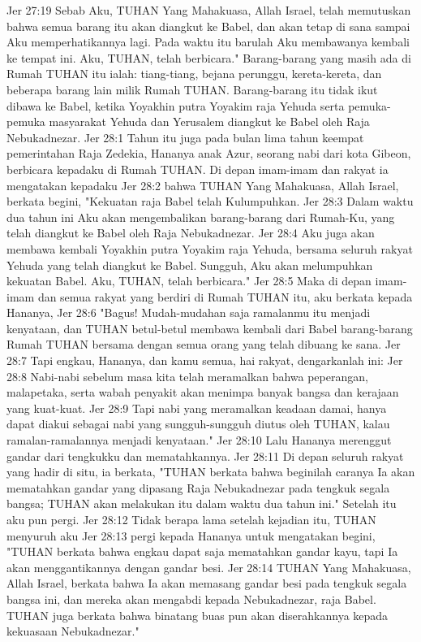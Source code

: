 Jer 27:19  Sebab Aku, TUHAN Yang Mahakuasa, Allah Israel, telah memutuskan bahwa semua barang itu akan diangkut ke Babel, dan akan tetap di sana sampai Aku memperhatikannya lagi. Pada waktu itu barulah Aku membawanya kembali ke tempat ini. Aku, TUHAN, telah berbicara." Barang-barang yang masih ada di Rumah TUHAN itu ialah: tiang-tiang, bejana perunggu, kereta-kereta, dan beberapa barang lain milik Rumah TUHAN. Barang-barang itu tidak ikut dibawa ke Babel, ketika Yoyakhin putra Yoyakim raja Yehuda serta pemuka-pemuka masyarakat Yehuda dan Yerusalem diangkut ke Babel oleh Raja Nebukadnezar.
Jer 28:1  Tahun itu juga pada bulan lima tahun keempat pemerintahan Raja Zedekia, Hananya anak Azur, seorang nabi dari kota Gibeon, berbicara kepadaku di Rumah TUHAN. Di depan imam-imam dan rakyat ia mengatakan kepadaku
Jer 28:2  bahwa TUHAN Yang Mahakuasa, Allah Israel, berkata begini, "Kekuatan raja Babel telah Kulumpuhkan.
Jer 28:3  Dalam waktu dua tahun ini Aku akan mengembalikan barang-barang dari Rumah-Ku, yang telah diangkut ke Babel oleh Raja Nebukadnezar.
Jer 28:4  Aku juga akan membawa kembali Yoyakhin putra Yoyakim raja Yehuda, bersama seluruh rakyat Yehuda yang telah diangkut ke Babel. Sungguh, Aku akan melumpuhkan kekuatan Babel. Aku, TUHAN, telah berbicara."
Jer 28:5  Maka di depan imam-imam dan semua rakyat yang berdiri di Rumah TUHAN itu, aku berkata kepada Hananya,
Jer 28:6  "Bagus! Mudah-mudahan saja ramalanmu itu menjadi kenyataan, dan TUHAN betul-betul membawa kembali dari Babel barang-barang Rumah TUHAN bersama dengan semua orang yang telah dibuang ke sana.
Jer 28:7  Tapi engkau, Hananya, dan kamu semua, hai rakyat, dengarkanlah ini:
Jer 28:8  Nabi-nabi sebelum masa kita telah meramalkan bahwa peperangan, malapetaka, serta wabah penyakit akan menimpa banyak bangsa dan kerajaan yang kuat-kuat.
Jer 28:9  Tapi nabi yang meramalkan keadaan damai, hanya dapat diakui sebagai nabi yang sungguh-sungguh diutus oleh TUHAN, kalau ramalan-ramalannya menjadi kenyataan."
Jer 28:10  Lalu Hananya merenggut gandar dari tengkukku dan mematahkannya.
Jer 28:11  Di depan seluruh rakyat yang hadir di situ, ia berkata, "TUHAN berkata bahwa beginilah caranya Ia akan mematahkan gandar yang dipasang Raja Nebukadnezar pada tengkuk segala bangsa; TUHAN akan melakukan itu dalam waktu dua tahun ini." Setelah itu aku pun pergi.
Jer 28:12  Tidak berapa lama setelah kejadian itu, TUHAN menyuruh aku
Jer 28:13  pergi kepada Hananya untuk mengatakan begini, "TUHAN berkata bahwa engkau dapat saja mematahkan gandar kayu, tapi Ia akan menggantikannya dengan gandar besi.
Jer 28:14  TUHAN Yang Mahakuasa, Allah Israel, berkata bahwa Ia akan memasang gandar besi pada tengkuk segala bangsa ini, dan mereka akan mengabdi kepada Nebukadnezar, raja Babel. TUHAN juga berkata bahwa binatang buas pun akan diserahkannya kepada kekuasaan Nebukadnezar."
